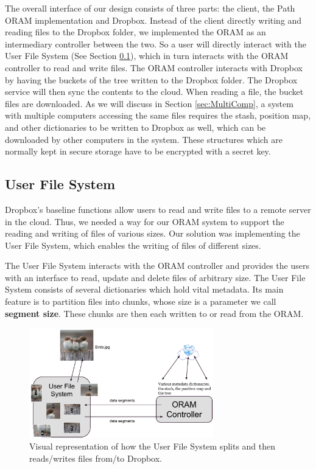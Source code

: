 \documentclass[conference]{IEEEtran}
\begin{document}
The overall interface of our design consists of three parts: the client, the Path ORAM implementation and Dropbox. Instead of the client directly writing and reading files to the Dropbox folder, we implemented the ORAM as an intermediary controller between the two. So a user will directly interact with the User File System (See Section \ref{sec:UFS}), which in turn interacts with the ORAM controller to read and write files. The ORAM controller interacts with Dropbox by having the buckets of the tree written to the Dropbox folder. The Dropbox service will then sync the contents to the cloud. When reading a file, the bucket files are downloaded. As we will discuss in Section \ref{sec:MultiComp}, a system with multiple computers accessing the same files requires the stash, position map, and other dictionaries to be written to Dropbox as well, which can be downloaded by other computers in the system. These structures which are normally kept in secure storage have to be encrypted with a secret key.

\subsection{User File System}

\label{sec:UFS}
Dropbox's baseline functions allow users to read and write files to a remote server in the cloud. Thus, we needed a way for our ORAM system to support the reading and writing of files of various sizes. Our solution was implementing the User File System, which enables the writing of files of different sizes. 

The User File System interacts with the ORAM controller and provides the users with an interface to read, update and delete files of arbitrary size. The User File System consists of several dictionaries which hold vital metadata. Its main feature is to partition files into chunks, whose size is a parameter we call {\bf segment size}. These chunks are then each written to or read from the ORAM.

\begin{figure}
\begin{center}
\includegraphics[width=8cm]{320.pdf}
\caption{Visual representation of how the User File System splits and then reads/writes files from/to Dropbox.}
\label{fig:userfilesys}
\end{center}
\end{figure}
\end{document}
